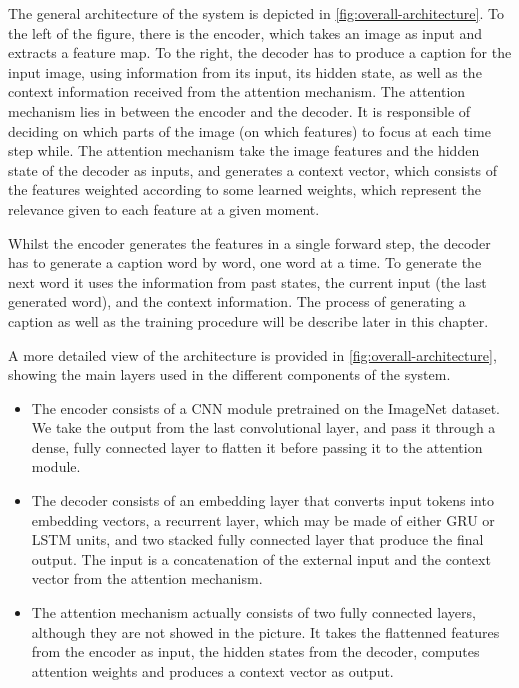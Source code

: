 The general architecture of the system is depicted in \cref{fig:overall-architecture}. To the left of the figure, there is the encoder, which takes an image as input and extracts a feature map. To the right, the decoder has to produce a caption for the input image, using information from its input, its hidden state, as well as the context information received from the attention mechanism. The attention mechanism lies in between the encoder and the decoder. It is responsible of deciding on which parts of the image (on which features) to focus at each time step while. The attention mechanism take the image features and the hidden state of the decoder as inputs, and generates a context vector, which consists of the features weighted according to some learned weights, which represent the relevance given to each feature at a given moment.

Whilst the encoder generates the features in a single forward step, the decoder has to generate a caption word by word, one word at a time. To generate the next word it uses the information from past states, the current input (the last generated word), and the context information. The process of generating a caption as well as the training procedure will be describe later in this chapter.

A more detailed view of the architecture is provided in \cref{fig:overall-architecture}, showing the main layers used in the different components of the system. 
\begin{itemize}
    \item The encoder consists of a CNN module pretrained on the ImageNet dataset. We take the output from the last convolutional layer, and pass it through a dense, fully connected layer to flatten it before passing it to the attention module. 
    \item The decoder consists of an embedding layer that converts input tokens into embedding vectors, a recurrent layer, which may be made of either GRU or LSTM units, and two stacked fully connected layer that produce the final output. The input is a concatenation of the external input and the context vector from the attention mechanism.
    \item The attention mechanism actually consists of two fully connected layers, although they are not showed in the picture. It takes the flattenned features from the encoder as input, the hidden states from the decoder, computes attention weights and produces a context vector as output.
\end{itemize}


